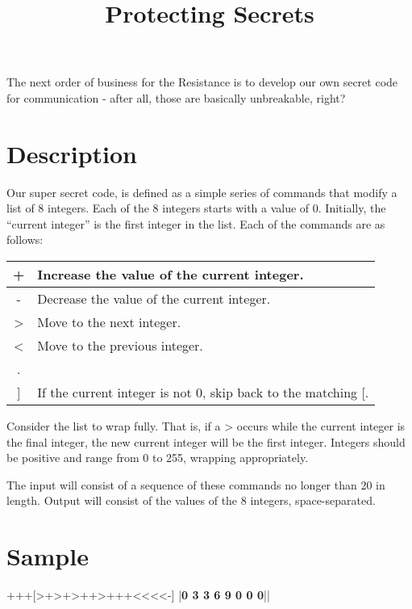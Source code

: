 \documentclass{../codeproblem}
\begin{document}
\title{Protecting Secrets}

\begin{flavor}
  The next order of business for the Resistance is to develop our own secret code for communication - after all, those are basically unbreakable, right?
\end{flavor}

\section*{Description}
Our super secret code, is defined as a simple series of commands that modify a list of 8 integers. Each of the 8 integers starts with a value of 0. Initially, the ``current integer'' is the first integer in the list.  Each of the commands are as follows:

\begin{center}
\begin{tabular}{| c | l |}\hline
  + & Increase the value of the current integer.\\\hline
  - & Decrease the value of the current integer.\\\hline
  > & Move to the next integer.\\\hline
  < & Move to the previous integer.\\\hline
  [ & If the current integer is 0, skip to after the matching ].\\\hline
  ] & If the current integer is not 0, skip back to the matching [.\\\hline
\end{tabular}
\end{center}

Consider the list to wrap fully. That is, if a > occurs while the current integer is the final integer, the new current integer will be the first integer. Integers should be positive and range from 0 to 255, wrapping appropriately.

The input will consist of a sequence of these commands no longer than 20 in length. Output will consist of the values of the 8 integers, space-separated.

\section*{Sample}
\begin{example}
+++[>+>+>++>+++<<<<-]
|\textbf{0 3 3 6 9 0 0 0}||\end{example}
\end{document}
